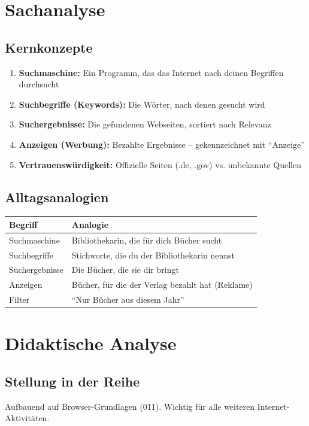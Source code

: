 \documentclass[11pt,a4paper]{article}
\begin{document}
\section{Sachanalyse}

\subsection{Kernkonzepte}
\begin{enumerate}
    \item \textbf{Suchmaschine:} Ein Programm, das das Internet nach deinen Begriffen durchsucht
    \item \textbf{Suchbegriffe (Keywords):} Die Wörter, nach denen gesucht wird
    \item \textbf{Suchergebnisse:} Die gefundenen Webseiten, sortiert nach Relevanz
    \item \textbf{Anzeigen (Werbung):} Bezahlte Ergebnisse -- gekennzeichnet mit ``Anzeige''
    \item \textbf{Vertrauenswürdigkeit:} Offizielle Seiten (.de, .gov) vs. unbekannte Quellen
\end{enumerate}

\subsection{Alltagsanalogien}
\begin{tabular}{|l|p{8cm}|}
\hline
\textbf{Begriff} & \textbf{Analogie} \\
\hline
Suchmaschine & Bibliothekarin, die für dich Bücher sucht \\
Suchbegriffe & Stichworte, die du der Bibliothekarin nennst \\
Suchergebnisse & Die Bücher, die sie dir bringt \\
Anzeigen & Bücher, für die der Verlag bezahlt hat (Reklame) \\
Filter & ``Nur Bücher aus diesem Jahr'' \\
\hline
\end{tabular}

\section{Didaktische Analyse}

\subsection{Stellung in der Reihe}
Aufbauend auf Browser-Grundlagen (011). Wichtig für alle weiteren Internet-Aktivitäten.
\end{document}
